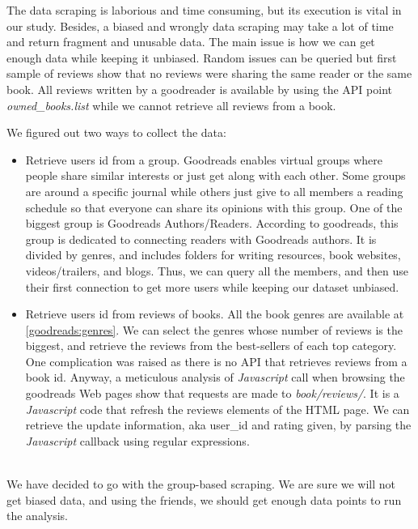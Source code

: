 \documentclass[11pt]{article}
\begin{document}
The data scraping is laborious and time consuming, but its execution is vital in our study. Besides, a biased and wrongly data scraping may take a lot of time and return fragment and unusable data.
The main issue is how we can get enough data while keeping it unbiased.
Random issues can be queried but first sample of reviews show that no reviews were sharing the same reader or the same book.
All reviews written by a goodreader is available by using the API point \textit{owned\_books.list} while we cannot retrieve all reviews from a book.


We figured out two ways to collect the data:
\begin{itemize}
\item Retrieve users id from a group.\newline
Goodreads enables virtual groups where people share similar interests or just get along with each other.
Some groups are around a specific journal while others just give to all members a reading schedule so that everyone can share its opinions with this group.
One of the biggest group is Goodreads Authors/Readers.
According to goodreads, this group is dedicated to connecting readers with Goodreads authors.
It is divided by genres, and includes folders for writing resources, book websites, videos/trailers, and blogs.
Thus, we can query all the members, and then use their first connection to get more users while keeping our dataset unbiased.
\item Retrieve users id from reviews of books.\newline
All the book genres are available at \ref{goodreads:genres}.
We can select the genres whose number of reviews is the biggest, and retrieve the reviews from the best-sellers of each top category.
One complication was raised as there is no API that retrieves reviews from a book id.
Anyway, a meticulous analysis of \textit{Javascript} call when browsing the goodreads Web pages show that requests are made to \textit{book/reviews/}.
It is a \textit{Javascript} code that refresh the reviews elements of the HTML page.
We can retrieve the update information, aka user_id and rating given, by  parsing the \textit{Javascript} callback using regular expressions.
\end{itemize}
\\

We have decided to go with the group-based scraping.
We are sure we will not get biased data, and using the friends, we should get enough data points to run the analysis.
\end{document}
